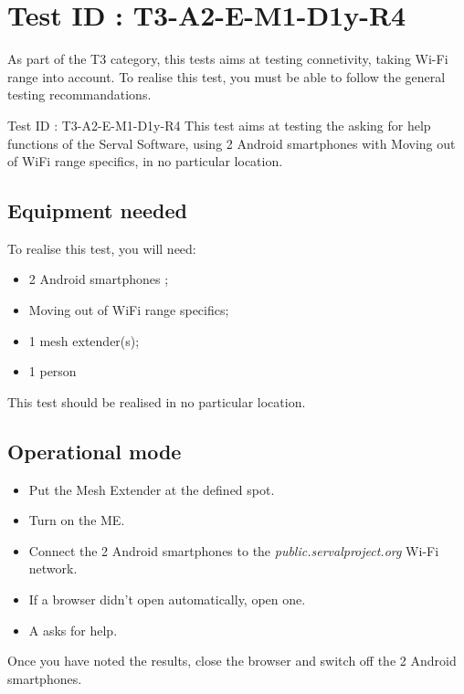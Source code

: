 \documentclass[oneside]{book}
\begin{document}
\section{Test ID : T3-A2-E-M1-D1y-R4}
\begin{itshape}
As part of the T3 category, this tests aims at testing connetivity, taking Wi-Fi range into account.
To realise this test, you must be able to follow the general testing recommandations.
\end{itshape}
\newline
Test ID : T3-A2-E-M1-D1y-R4
 This test aims at testing the asking for help functions of the Serval Software, using 2 Android smartphones with Moving out of WiFi range specifics, in no particular location.
\subsection{Equipment needed} To realise this test, you will need:
\begin{itemize}
\item 2 Android smartphones ;
\item Moving out of WiFi range specifics;
\item 1 mesh extender(s);
\item 1 person
\end{itemize}
This test should be realised in no particular location.
\subsection{Operational mode} \begin{itemize}
\item Put the Mesh Extender at the defined spot.
\item Turn on the ME.
\item Connect the 2 Android smartphones to the \emph{public.servalproject.org} Wi-Fi network.
\item If a browser didn't open automatically, open one.
\item A asks for help.
\end{itemize}
Once you have noted the results, close the browser and switch off the 2 Android smartphones.
\end{document}
